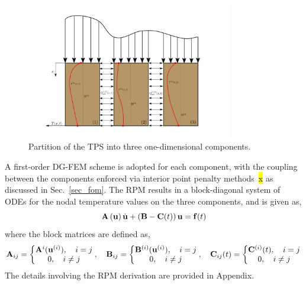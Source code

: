 \begin{figure}
    \centering
    \includegraphics[width=0.8\textwidth]{./figs/three_components.png}
    \caption{Partition of the TPS into three one-dimensional components.}
    \label{fig_domain_partition}
\end{figure}




A first-order DG-FEM scheme is adopted for each component, with the coupling between the components enforced via interior point penalty methods~\hl{x} as discussed in Sec.~\ref{sec_fom}. The RPM results in a block-diagonal system of ODEs for the nodal temperature values on the three components, and is given as,
\begin{equation}
    \mathbf{A}\left(\mathbf{u}\right)\dot{\mathbf{u}} + \left(\mathbf{B} - \mathbf{C}(t)\right)\mathbf{u} = \mathbf{f}(t)\label{eqn_rpm}
\end{equation}
where the block matrices are defined as,
\begin{equation}
    \mathbf{A}_{ij} = \left\{\begin{matrix}
        \mathbf{A}^{i}(\mathbf{u}^{(i)}),\quad i=j\\
        0,\quad i\neq j
    \end{matrix}\right.,\quad \mathbf{B}_{ij} = \left\{\begin{matrix}
        \mathbf{B}^{(i)}(\mathbf{u}^{(i)}),\quad i=j\\
        0,\quad i\neq j
    \end{matrix}\right.,\quad \mathbf{C}_{ij}(t) = \left\{\begin{matrix}
        \mathbf{C}^{(i)}(t),\quad i=j\\
        0,\quad i\neq j
    \end{matrix}\right.
\end{equation}
The details involving the RPM derivation are provided in Appendix.

